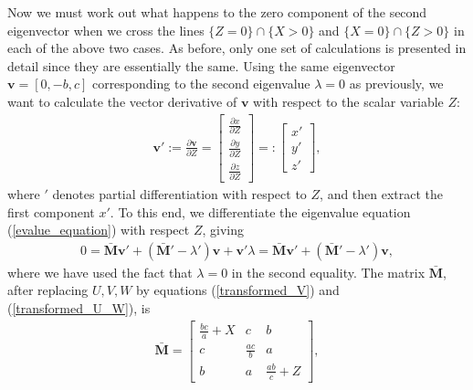 \documentclass[preprint,12pt]{elsarticle}
\newcommand{\M}{\mathbf{M}}
\newcommand{\bv}{\mathbf{v}}
\begin{document}
Now we must work out what happens to the zero component of the second eigenvector when we cross the lines $\{Z=0\}\cap\{X>0\}$ and $\{X=0\}\cap\{Z>0\}$ in each of the above two cases. As before, only one set of calculations is presented in detail since they are essentially the same. Using the same eigenvector $\bv=[0,-b,c]$ corresponding to the second eigenvalue $\lambda=0$ as previously,
we want to calculate the vector derivative of $\bv$ with respect to the scalar variable $Z$:
\begin{align}\label{v_derivative}
    \bv':=\frac{\partial \bv}{\partial Z}=  \begin{bmatrix}
                                            \frac{\partial x}{\partial Z}\\
                                            \frac{\partial y}{\partial Z}\\
                                            \frac{\partial z}{\partial Z}
                                        \end{bmatrix}
                                    =:   \begin{bmatrix}
                                            x'\\
                                            y'\\
                                            z'
                                        \end{bmatrix},
\end{align}
where $'$ denotes partial differentiation with respect to $Z$, and then extract the first component $x'$. To this end, we differentiate the eigenvalue equation (\ref{evalue_equation}) with respect $Z$, giving
\begin{align}\label{evalue_equation_derivative}
    0=\bar{\M}\bv'+(\bar{\M}'-\lambda ')\bv+\bv'\lambda=\bar{\M}\bv'+(\bar{\M}'-\lambda ')\bv,
\end{align}
where we have used the fact that $\lambda=0$ in the second equality. The matrix $\bar{\M}$, after replacing $U,V,W$ by equations (\ref{transformed_V}) and (\ref{transformed_U_W}), is
\begin{align}
    \bar{\M}=\begin{bmatrix}
                \frac{bc}{a}+X & c & b\\
                c & \frac{ac}{b} & a\\
                b & a & \frac{ab}{c}+Z
            \end{bmatrix},
\end{align}
\end{document}
